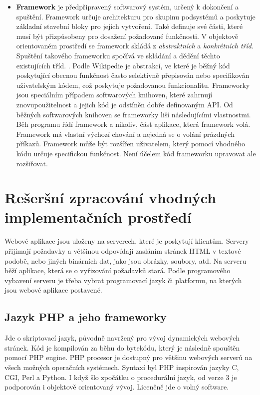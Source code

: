 \documentclass[11pt,twoside,a4paper]{book}
\begin{document}
\begin{itemize}
\item \textbf{Framework} je předpřipravený softwarový systém, určený k dokončení a spuštění. Framework určuje architekturu pro skupinu podsystémů a poskytuje základní stavební bloky pro jejich vytvoření. Také definuje své části, které musí být přizpůsobeny pro dosažení požadované funkčnosti. V objektově orientovaném prostředí se framework skládá z \textit{abstraktních} a \textit{konkrétních tříd}. Spuštění takového frameworku spočívá ve skládání a dědění těchto existujících tříd. \cite{POSA}. Podle Wikipedie je abstrakcí, ve které je běžný kód poskytující obecnou funkčnost často selektivně přepisován nebo specifikován uživatelským kódem, což poskytuje požadovanou funkcionalitu. Frameworky jsou speciálním případem softwarových knihoven, které zahrnují znovupoužitelnost a jejich kód je odstíněn dobře definovaným API. Od běžných softwarových knihoven se frameworky liší následujícími vlastnostmi. Běh programu řídí framework a nikoliv, část aplikace, která framework volá. Framework má vlastní výchozí chování a nejedná se o volání prázdných příkazů. Framework může být rozšířen uživatelem, který pomocí vhodného kódu určuje specifickou funkčnost. Není účelem kód frameworku upravovat ale rozšiřovat. \cite{wiki:software-framework} 
\end{itemize}

\section{Rešeršní zpracování vhodných implementačních prostředí}

Webové aplikace jsou uloženy na serverech, které je poskytují klientům. Servery přijímají požadavky a většinou odpovídají zasláním stránek HTML v textové podobě, nebo jiných binárních dat, jako jsou obrázky, soubory, atd. Na serveru běží aplikace, která se o vyřizování požadavků stará. Podle programového vybavení serveru je třeba vybrat programovací jazyk či platformu, na kterých jsou webové aplikace postavené.

\subsection{Jazyk PHP a jeho frameworky}
Jde o skriptovací jazyk, původně navržený pro vývoj dynamických webových stránek. Kód je kompilován za běhu do bytekódu, který je následně spouštěn pomocí PHP engine\cite{wiki:php}. PHP procesor je dostupný pro většinu webových serverů na všech možných operačních systémech. Syntaxí byl PHP inspirován jazyky C, CGI, Perl a Python. I když šlo zpočátku o procedurální jazyk, od verze 3  je podporován i objektově orientovaný vývoj. Licenčně jde o volný software.\cite{phpmanual}
 
\end{document}
